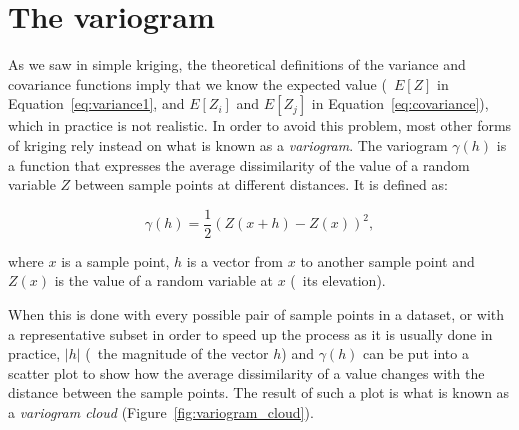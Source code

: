 \section{The variogram}

As we saw in simple kriging, the theoretical definitions of the variance and covariance functions imply that we know the expected value (\ie\ \(E[Z]\) in Equation~\ref{eq:variance1}, and \(E[Z_i]\) and \(E[Z_j]\) in Equation~\ref{eq:covariance}), which in practice is not realistic.
In order to avoid this problem, most other forms of kriging rely instead on what is known as a \emph{variogram}.
The variogram \(\gamma(h)\) is a function that expresses the average dissimilarity of the value of a random variable \(Z\) between sample points at different distances.
It is defined as:

\begin{equation}
\gamma(h) = \frac{1}{2} (Z(x+h) - Z(x))^2,
\end{equation}

where \(x\) is a sample point, \(h\) is a vector from \(x\) to another sample point and \(Z(x)\) is the value of a random variable at \(x\) (\eg\ its elevation).

When this is done with every possible pair of sample points in a dataset, or with a representative subset in order to speed up the process as it is usually done in practice, \(|h|\) (\ie\ the magnitude of the vector \(h\)) and \(\gamma(h)\) can be put into a scatter plot to show how the average dissimilarity of a value changes with the distance between the sample points.
The result of such a plot is what is known as a \emph{variogram cloud} (Figure~\ref{fig:variogram_cloud}).

